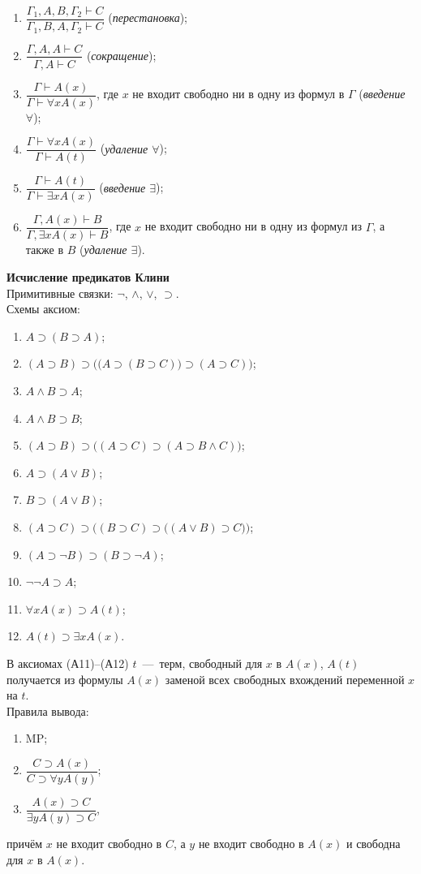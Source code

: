 \begin{enumerate}[label=\arabic*)]
    \item $\dfrac{\Gamma_1, A, B, \Gamma_2 \vdash C}{\Gamma_1, B, A, \Gamma_2 \vdash C}$ (\textit{перестановка});
    \item $\dfrac{\Gamma, A, A \vdash C}{\Gamma, A \vdash C}$ (\textit{сокращение});
    \item $\dfrac{\Gamma \vdash A(x)}{\Gamma \vdash \forall xA(x)}$, где $x$ не входит свободно ни в одну из формул в $\Gamma$ (\textit{введение $\forall$});
    \item $\dfrac{\Gamma \vdash \forall xA(x)}{\Gamma \vdash A(t)}$ (\textit{удаление $\forall$});
    \item $\dfrac{\Gamma \vdash A(t)}{\Gamma \vdash \exists xA(x)}$ (\textit{введение $\exists$});
    \item $\dfrac{\Gamma, A(x) \vdash B}{\Gamma, \exists xA(x) \vdash B}$, где $x$ не входит свободно ни в одну из формул из $\Gamma$, а также в $B$ (\textit{удаление $\exists$}).
\end{enumerate}

\textbf{Исчисление предикатов Клини} \\
Примитивные связки: $\neg$, $\land$, $\lor$, $\supset$. \\
Схемы аксиом: 
\begin{enumerate}[label=(А\arabic*)]
    \item $A \supset (B \supset A)$;
    \item $(A \supset B) \supset \Big(\big(A \supset (B \supset C)\big) \supset (A \supset C)\Big)$;
    \item $A \land B \supset A$;
    \item $A \land B \supset B$;
    \item $(A \supset B) \supset \big((A \supset C) \supset (A \supset B \land C)\big)$;
    \item $A \supset (A \lor B)$;
    \item $B \supset (A \lor B)$;
    \item $(A \supset C) \supset \Big((B \supset C) \supset \big((A \lor B) \supset C\big)\Big)$;
    \item $(A \supset \neg B) \supset (B \supset \neg A)$;
    \item $\neg\neg A \supset A$;
    \item $\forall xA(x) \supset A(t)$;
    \item $A(t) \supset \exists xA(x)$.
\end{enumerate}
В аксиомах (А11)--(А12) $t$~---~терм, свободный для $x$ в $A(x)$, $A(t)$ получается из формулы $A(x)$ заменой всех свободных вхождений переменной $x$ на $t$. \\
Правила вывода: 
\begin{enumerate}[label=\Roman*.]
    \item MP;
    \item $\dfrac{C \supset A(x)}{C \supset \forall yA(y)}$;
    \item $\dfrac{A(x) \supset C}{\exists yA(y) \supset C}$,
\end{enumerate}
причём $x$ не входит свободно в $C$, а $y$ не входит свободно в $A(x)$ и свободна для $x$ в $A(x)$. 